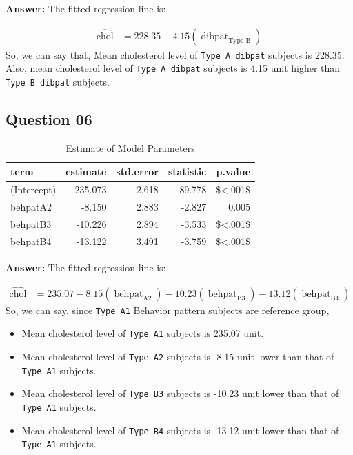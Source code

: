 \documentclass[
  12pt,
  oneside]{article}
\providecommand{\tightlist}{%
  \setlength{\itemsep}{0pt}\setlength{\parskip}{0pt}}
\begin{document}
\textbf{Answer:} The fitted regression line is:

\begin{equation}
\label{eq: eq2}
\begin{aligned}
\operatorname{\widehat{chol}} &= 228.35 - 4.15(\operatorname{dibpat}_{\operatorname{Type\ B}})
\end{aligned}
\end{equation}
So, we can say that, Mean cholesterol level of \texttt{Type\ A\ dibpat} subjects is 228.35. Also, mean cholesterol level of \texttt{Type\ A\ dibpat} subjects is 4.15 unit higher than \texttt{Type\ B\ dibpat} subjects.

\hypertarget{question-06}{%
\subsection{Question 06}\label{question-06}}

\begin{table}[H]

\caption{\label{tab:Table-08}Estimate of Model Parameters}
\centering
\begin{tabular}[t]{lrrrr}
\toprule
term & estimate & std.error & statistic & p.value\\
\midrule
(Intercept) & 235.073 & 2.618 & 89.778 & \$<.001\$\\
behpatA2 & -8.150 & 2.883 & -2.827 & 0.005\\
behpatB3 & -10.226 & 2.894 & -3.533 & \$<.001\$\\
behpatB4 & -13.122 & 3.491 & -3.759 & \$<.001\$\\
\bottomrule
\end{tabular}
\end{table}

\textbf{Answer:} The fitted regression line is:

\begin{equation}
\label{eq: eq3}
\begin{aligned}
\operatorname{\widehat{chol}} &= 235.07 - 8.15(\operatorname{behpat}_{\operatorname{A2}}) - 10.23(\operatorname{behpat}_{\operatorname{B3}}) - 13.12(\operatorname{behpat}_{\operatorname{B4}})
\end{aligned}
\end{equation}
So, we can say, since \texttt{Type\ A1} Behavior pattern subjects are reference group,

\begin{itemize}
\tightlist
\item
  Mean cholesterol level of \texttt{Type\ A1} subjects is 235.07 unit.
\item
  Mean cholesterol level of \texttt{Type\ A2} subjects is -8.15 unit lower than that of \texttt{Type\ A1} subjects.
\item
  Mean cholesterol level of \texttt{Type\ B3} subjects is -10.23 unit lower than that of \texttt{Type\ A1} subjects.
\item
  Mean cholesterol level of \texttt{Type\ B4} subjects is -13.12 unit lower than that of \texttt{Type\ A1} subjects.
\end{itemize}
\end{document}
